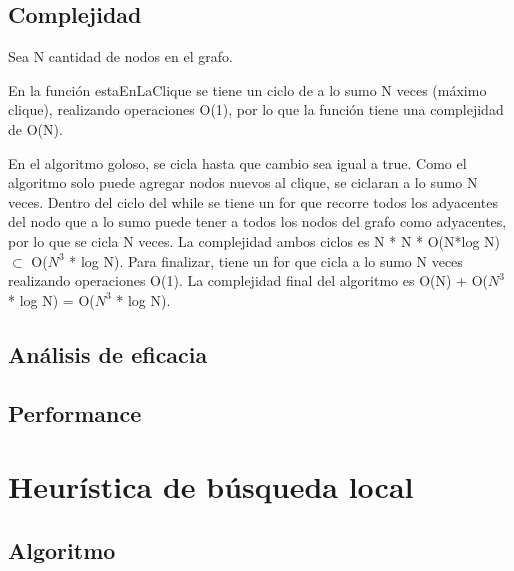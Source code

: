 \documentclass[a4paper, 10pt, twoside]{article}
\begin{document}
\subsection{Complejidad}
Sea N cantidad de nodos en el grafo.

En la función estaEnLaClique se tiene un ciclo de a lo sumo N veces (máximo clique), realizando operaciones O(1), por lo que la función tiene una complejidad de O(N).

En el algoritmo goloso, se cicla hasta que cambio sea igual a true. Como el algoritmo solo puede agregar nodos nuevos al clique, se ciclaran a lo sumo N veces.
Dentro del ciclo del while se tiene un for que recorre todos los adyacentes del nodo que a lo sumo puede tener a todos los nodos del grafo como adyacentes, por lo que se cicla N veces.
La complejidad ambos ciclos es N * N * O(N*log N) $\subset$ O($N^3$ * log N).
Para finalizar, tiene un for que cicla a lo sumo N veces realizando operaciones O(1).
La complejidad final del algoritmo es O(N) + O($N^3$ * log N) = O($N^3$ * log N).

\subsection{Análisis de eficacia}

\subsection{Performance}


\newpage

\section{Heurística de búsqueda local}
\subsection{Algoritmo}
\end{document}
